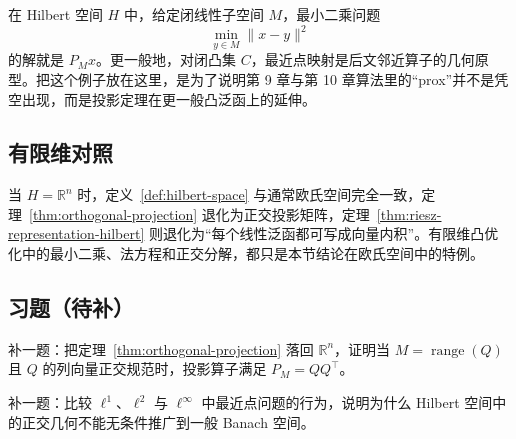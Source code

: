 \begin{example}[最小二乘与邻近映射触点]\label{ex:least-squares-hilbert}
在 Hilbert 空间 $H$ 中，给定闭线性子空间 $M$，最小二乘问题
\[
\min_{y\in M}\|x-y\|^2
\]
的解就是 $P_Mx$。更一般地，对闭凸集 $C$，最近点映射是后文邻近算子的几何原型。把这个例子放在这里，是为了说明第 9 章与第 10 章算法里的“prox”并不是凭空出现，而是投影定理在更一般凸泛函上的延伸。
\end{example}

\subsection*{有限维对照}

当 $H=\mathbb R^n$ 时，定义~\ref{def:hilbert-space} 与通常欧氏空间完全一致，定理~\ref{thm:orthogonal-projection} 退化为正交投影矩阵，定理~\ref{thm:riesz-representation-hilbert} 则退化为“每个线性泛函都可写成向量内积”。有限维凸优化中的最小二乘、法方程和正交分解，都只是本节结论在欧氏空间中的特例。

\subsection*{习题（待补）}

\begin{exercise}[投影定理的矩阵版占位]\label{exr:projection-matrix-placeholder}
补一题：把定理~\ref{thm:orthogonal-projection} 落回 $\mathbb R^n$，证明当 $M=\operatorname{range}(Q)$ 且 $Q$ 的列向量正交规范时，投影算子满足 $P_M=QQ^\top$。
\end{exercise}

\begin{exercise}\label{exr:banach-hilbert-bridge-placeholder}
补一题：比较 $\ell^1$、$\ell^2$ 与 $\ell^\infty$ 中最近点问题的行为，说明为什么 Hilbert 空间中的正交几何不能无条件推广到一般 Banach 空间。
\end{exercise}
